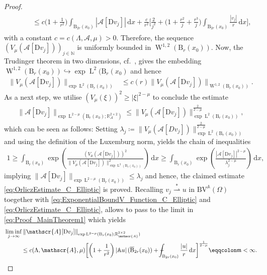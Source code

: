 \documentclass[a4paper,10pt,reqno,oneside]{amsart}
\numberwithin{equation}{section}
\newcommand{\R}{\mathbb R}
\newcommand{\N}{\mathbb N}
\newcommand{\ball}{\mathrm{B}}
\newcommand{\A}{\mathscr{A}}
\newcommand{\Aop}{\mathbb{A}}
\newcommand{\lebe}{\operatorname{L}}
\newcommand{\sobo}{\operatorname{W}}
\newcommand{\BV}{\mathrm{BV}}
\newcommand{\D}{\mathrm{D}}
\newcommand{\dx}[1]{\,\mathrm{d}#1}
\newcommand{\abs}[1]{\left\lvert#1\right\rvert}
\newcommand{\F}{\mathscr{F}}
\newcommand{\weakstar}{\overset{\ast}{\rightharpoonup}}
\renewcommand{\L}{\mathrm{L}}
\def\Xint#1{\mathchoice
	{\XXint\displaystyle\textstyle{#1}}%
	{\XXint\textstyle\scriptstyle{#1}}%
	{\XXint\scriptstyle\scriptscriptstyle{#1}}%
	{\XXint\scriptscriptstyle\scriptscriptstyle{#1}}%
	\!\int}
\def\XXint#1#2#3{{\setbox0=\hbox{$#1{#2#3}{\int}$ }
		\vcenter{\hbox{$#2#3$ }}\kern-.6\wd0}}
\def\dashint{\Xint-}
\begin{document}
\begin{proof}
\begin{align}
\begin{split}
	&\hspace{1cm}\leq c \bigg(1+\frac{1}{r^2}\bigg) \int_{\ball_{2r}(x_0)} \abs{\A[\D v_j]}\dx{x} + \frac{c}{r^2} \bigg[\frac{2}{j^2} + \bigg(1+\frac{r^2}{j}+\frac{r^3}{j}\bigg)\int_{\ball_{2r}(x_0)} \frac{\abs{v_j}}{r}\dx{x}\bigg], 
	\end{split}
	\end{align}
	with a constant $c=c(\Lambda,\A,\mu)>0$. Therefore, the sequence $(V_\mu(\A[\D v_j]))_{j\in\N}$ is uniformly bounded in $\sobo^{1,2}(\ball_r(x_0))$.
	Now, the Trudinger theorem in two dimensions, cf.~\cite{Trudinger}, gives the embedding $\sobo^{1,2}(\ball_r(x_0))\hookrightarrow\exp \lebe^2(\ball_{r}(x_0)$ and hence
	\begin{align}\label{eq:ExponentialBoundV_Function_C_Elliptic}
	 \|V_\mu(\A[\D v_j])\|_{\exp\lebe^2(\ball_{r}(x_0))}
	 &\leq
	 c(r) \|V_\mu(\A[\D v_j])\|_{\sobo^{1,2}(\ball_r(x_0))}.
	\end{align}
	As a next step, we utilise $(V_\mu(\xi))^2\geq \abs{\xi}^{2-\mu}$ to conclude the estimate 
	\begin{align}\label{eq:OrliczEstimate_C_Elliptic}
		\| \A[\D v_j]\|_{\exp\lebe^{2-\mu}(\ball_{r}(x_0);\R^{2\times 2}_\A)}\leq \|V_\mu(\A[\D v_j])\|_{\exp \lebe^2(\ball_{r}(x_0))}^\frac{2}{2-\mu},
	\end{align}
	which can be seen as follows: 
	Setting $\lambda_j\coloneqq \|V_\mu(\A[D v_j])\|^{\frac{2}{2-\mu}}_{\exp\lebe^2(\ball_r(x_0))}$ and using the definition of the Luxemburg norm, yields the chain of inequalities
	\begin{align*}
		1\geq \int_{\ball_r(x_0)} \exp\left(\frac{(V_\mu(\A[\D v_j]))^2}{\|V_\mu(\A[\D v_j])\|^2_{\exp\lebe^2(\ball_r(x_0))}}\right)\dx{x}\geq \int_{\ball_r(x_0)} \exp\left(\frac{\abs{\A [\D v_j]}^{2-\mu}}{\lambda_j^{2-\mu}}\right)\dx{x}, 
	\end{align*}
implying $\|\A[\D  v_j]\|_{\exp\lebe^{2-\mu}(\ball_{r}(x_0))}\leq \lambda_j$ and hence, the claimed estimate \eqref{eq:OrliczEstimate_C_Elliptic} is proved. Recalling $v_j\weakstar u$ in $\BV^\Aop(\Omega)$ toegether with \eqref{eq:ExponentialBoundV_Function_C_Elliptic} and \eqref{eq:OrliczEstimate_C_Elliptic}, allows to pass to the limit in \eqref{eq:Proof_MainTheorem1} which yields
\begin{align}\label{eq:Liminf_MainTheorem}
	\begin{split}
	&\liminf_{j\to\infty} \|\A[\D v_j]\|_{\exp\L^{2-\mu}(\ball_r(x_0);\R^{2\times 2}_\A)} \\
	&\hspace{1cm}\leq c(\Lambda,\A,\mu) \bigg[\bigg(1+\frac{1}{r^2}\bigg) \abs{\Aop u}(\overline{\ball}_{2r}(x_0))+ \dashint_{\ball_{2r}(x_0)} \frac{\abs{u}}{r}\dx{x} \bigg]^{\frac{1}{2-\mu}}\eqqcolon \mathfrak{m}<\infty. 
	\end{split}
\end{align}


\end{proof}
\end{document}
